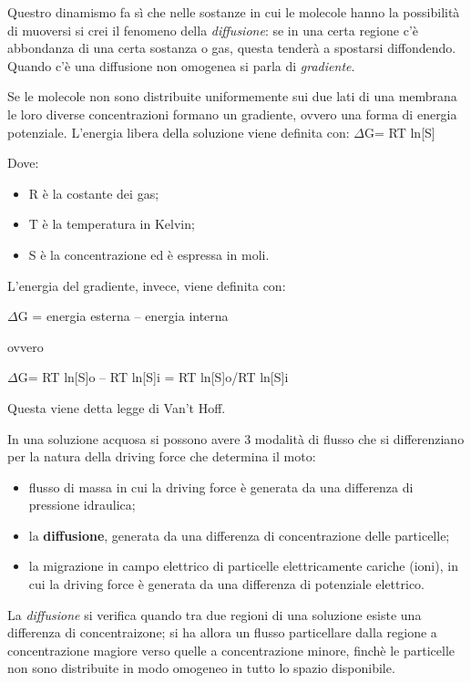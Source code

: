 \documentclass[]{article}
\begin{document}
Questro dinamismo fa sì che nelle sostanze in cui le molecole hanno la
possibilità di muoversi si crei il fenomeno della \emph{diffusione}: se
in una certa regione c'è abbondanza di una certa sostanza o gas, questa
tenderà a spostarsi diffondendo. Quando c'è una diffusione non omogenea
si parla di \emph{gradiente}.

Se le molecole non sono distribuite uniformemente sui due lati di una
membrana le loro diverse concentrazioni formano un gradiente, ovvero una
forma di energia potenziale. L'energia libera della soluzione viene
definita con: \(\Delta\)G= RT ln{[}S{]}

Dove:

\begin{itemize}
\itemsep1pt\parskip0pt
\item
  R è la costante dei gas;
\item
  T è la temperatura in Kelvin;
\item
  S è la concentrazione ed è espressa in moli.
\end{itemize}

L'energia del gradiente, invece, viene definita con:

\(\Delta\)G = energia esterna -- energia interna

ovvero

\(\Delta\)G= RT ln{[}S{]}o -- RT ln{[}S{]}i = RT ln{[}S{]}o/RT
ln{[}S{]}i

Questa viene detta legge di Van't Hoff.

In una soluzione acquosa si possono avere 3 modalità di flusso che si
differenziano per la natura della driving force che determina il moto:

\begin{itemize}
\itemsep1pt\parskip0pt
\item
  flusso di massa in cui la driving force è generata da una differenza
  di pressione idraulica;
\item
  la \textbf{diffusione}, generata da una differenza di concentrazione
  delle particelle;
\item
  la migrazione in campo elettrico di particelle elettricamente cariche
  (ioni), in cui la driving force è generata da una differenza di
  potenziale elettrico.
\end{itemize}

La \emph{diffusione} si verifica quando tra due regioni di una soluzione
esiste una differenza di concentraizone; si ha allora un flusso
particellare dalla regione a concentrazione magiore verso quelle a
concentrazione minore, finchè le particelle non sono distribuite in modo
omogeneo in tutto lo spazio disponibile.
\end{document}
